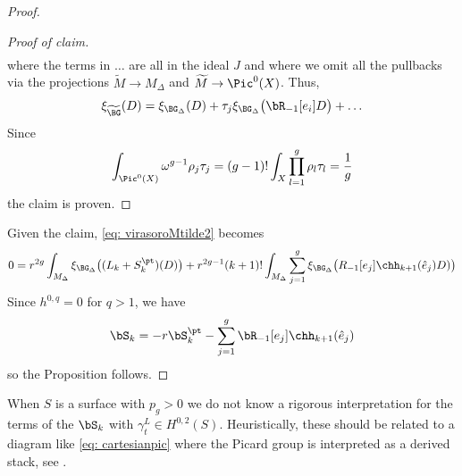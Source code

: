 \begin{proof}
\begin{proof}[Proof of claim]
\begin{align*}
\end{align*}
where the terms in $\ldots$ are all in the ideal $J$ and where we omit all the pullbacks via the projections $\widetilde M\to M_\Delta$ and $\widetilde M\to \Pic^0(X)$. Thus,
\begin{align*}
\xi_{\widetilde \BG}(D)=\xi_{\BG_\Delta}(D)+\tau_j\xi_{\BG_\Delta}\big(\bR_{-1}[e_i]D\big)+\ldots
\end{align*}
Since
\[\int_{\Pic^0(X)}\omega^{g-1}\rho_j\tau_j=(g-1)!\int_X \prod_{l=1}^g \rho_l\tau_l=\frac{1}{g}\]
the claim is proven.\qedhere
\end{proof}
Given the claim, \eqref{eq: virasoroMtilde2} becomes
\[
0=r^{2g}\int_{M_\Delta}\xi_{\BG_\Delta}\big((L_k+S_k^\pt)(D)\big)+r^{2g-1}(k+1)!\int_{M_\Delta}\sum_{j=1}^g\xi_{\BG_\Delta}\big(R_{-1}[e_j]\chh_{k+1}(\hat e_j) D)\big)
\]
Since $h^{0, q}=0$ for $q>1$, we have
\[\bS_k=-r\bS_k^\pt-\sum_{j=1}^g \bR_{-1}[e_j]\chh_{k+1}(\hat e_j) \]
so the Proposition follows. \qedhere
\end{proof}
\begin{remark}
\notready\label{rem: fixed det}
When $S$ is a surface with $p_g>0$ we do not know a rigorous interpretation for the terms of the $\bS_k$ with $\gamma_t^L\in H^{0,2}(S)$. Heuristically, these should be related to a diagram like \eqref{eq: cartesianpic} where the Picard group is interpreted as a derived stack, see \cite{STV}.
\end{remark}

